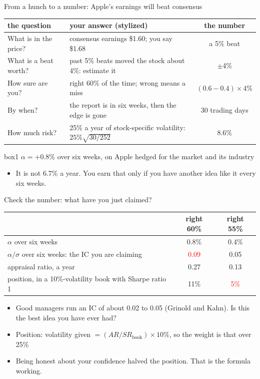 \documentclass[aspectratio=169,10pt]{beamer}
\begin{document}
\begin{frame}{From a hunch to a number: Apple's earnings will beat consensus}
\vskip 2pt
\begin{center}
\renewcommand{\arraystretch}{1.3}
\small
\begin{tabular}{P{3.2cm}P{6.7cm}c}
\toprule
the question & your answer (stylized) & the number \\
\midrule
What is in the price? & consensus earnings \$1.60; you say \$1.68 & a 5\% beat \\
What is a beat worth? & past 5\% beats moved the stock about 4\%: estimate it & $\pm$4\% \\
How sure are you? & right 60\% of the time; wrong means a miss & $(0.6-0.4)\times 4\%$ \\
By when? & the report is in six weeks, then the edge is gone & 30 trading days \\
How much risk? & 25\% a year of stock-specific volatility: $25\%\sqrt{30/252}$ & 8.6\% \\
\bottomrule
\end{tabular}
\end{center}
\vskip 8pt
\begin{beamercolorbox}[rounded=true,sep=7pt,center]{box1}
$\alpha = +0.8\%$ over six weeks, on Apple hedged for the market and its industry
\end{beamercolorbox}
\vskip 8pt
\begin{itemize}
\item It is not 6.7\% a year. You earn that only if you have another idea like it every six weeks.
\end{itemize}
\end{frame}

\begin{frame}{Check the number: what have you just claimed?}
\vskip 4pt
\begin{center}
\renewcommand{\arraystretch}{1.35}
\begin{tabular}{lcc}
\toprule
 & right 60\% & right 55\% \\
\midrule
$\alpha$ over six weeks & 0.8\% & 0.4\% \\
$\alpha/\sigma$ over six weeks: the IC you are claiming & \textcolor{red}{0.09} & 0.05 \\
appraisal ratio, a year & 0.27 & 0.13 \\
position, in a 10\%-volatility book with Sharpe ratio 1 & 11\% & \textcolor{red}{5\%} \\
\bottomrule
\end{tabular}
\end{center}
\vskip 10pt
\begin{itemize}
\item Good managers run an IC of about 0.02 to 0.05 (Grinold and Kahn). Is this the best idea you have ever had?
\vskip 6pt
\item Position: volatility given $= (AR/SR_{\text{book}})\times 10\%$, so the weight is that over 25\%
\vskip 6pt
\item Being honest about your confidence halved the position. That is the formula working.
\end{itemize}
\end{frame}
\end{document}
